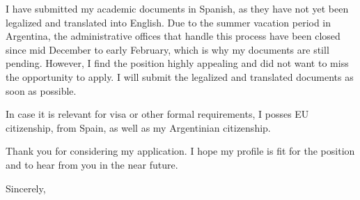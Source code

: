 \documentclass{letter}
\begin{document}
\begin{letter}{}

I have submitted my academic documents in Spanish, as they have not yet been legalized and translated into English. Due to the summer vacation period in Argentina, the administrative offices that handle this process have been closed since mid December to early February, which is why my documents are still pending. However, I find the position highly appealing and did not want to miss the opportunity to apply. I will submit the legalized and translated documents as soon as possible. 
  
  In case it is relevant for visa or other formal requirements, I posses EU citizenship, from Spain, as well as my Argentinian citizenship.

  Thank you for considering my application. I hope my profile is fit for the position and to hear from you in the near future.
\closing{Sincerely,}
\end{letter}
\end{document}
